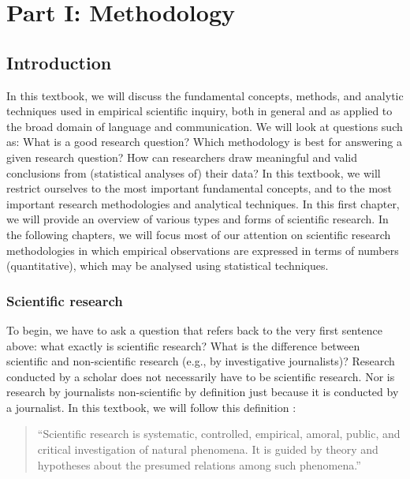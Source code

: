 \documentclass[
]{book}
\begin{document}
\part*{Part I: Methodology}\label{part-part-i-methodology}

\chapter{Introduction}\label{ch-introduction}

In this textbook, we will discuss the fundamental concepts, methods, and analytic techniques used in empirical scientific inquiry, both in general and as applied to the broad domain of language and communication. We will look at questions such as: What is a good research question? Which methodology is best for answering a given research question? How can researchers draw meaningful and valid conclusions from (statistical analyses of) their data? In this textbook, we will restrict ourselves to the most important fundamental concepts, and to the most important research methodologies and analytical techniques. In this first chapter, we will provide an overview of various types and forms of scientific research. In the following chapters, we will focus most of our attention on scientific research methodologies in which empirical observations are expressed in terms of numbers (quantitative), which may be analysed using statistical techniques.

\section{Scientific research}\label{sec:scientific-research}

To begin, we have to ask a question that refers back to the very first sentence above: what exactly is scientific research? What is the difference between scientific and non-scientific research (e.g., by investigative journalists)? Research conducted by a scholar does not necessarily have to be scientific research. Nor is research by journalists non-scientific by definition just because it is conducted by a journalist. In this textbook, we will follow this definition \citep[p.14]{KL00}:

\begin{quote}
``Scientific
research is systematic, controlled, empirical, amoral, public, and
critical investigation of natural phenomena. It is guided by theory and hypotheses about the presumed relations among such phenomena.''
\end{quote}
\end{document}
